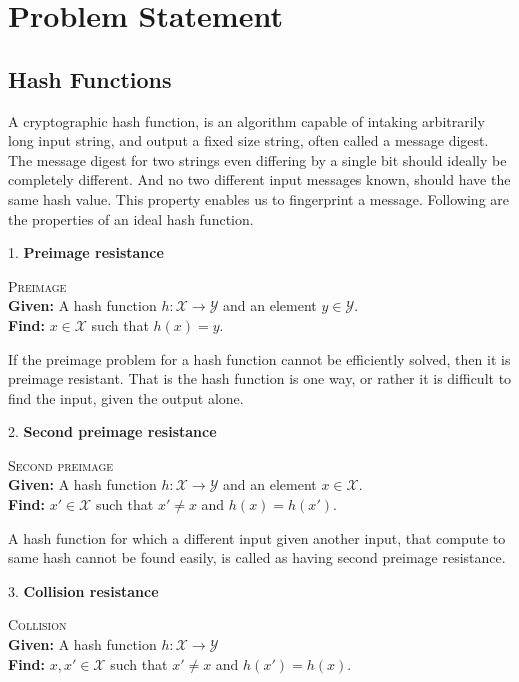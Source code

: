 \documentclass[12pt]{artikel3}                  %
\begin{document}
\clearpage

\section{Problem Statement}

\subsection{Hash Functions}
A cryptographic hash function, is an algorithm capable of intaking arbitrarily long input string, and
output a fixed size string, often called a message digest. The message digest for two strings even 
differing by a single bit should ideally be completely different. And no two different input messages
known, should have the same hash value. This property enables us to fingerprint a message. Following 
are the properties of an ideal hash function\cite{00005}.
  
1. {\bf Preimage resistance}
\begin{center}
  \framebox
  {
    \parbox{350pt}
    {
      \centering \textsc{Preimage} \\
      {\bf Given:} A hash function $h : \mathcal{X} \to \mathcal{Y}$ and an element $y \in \mathcal{Y}$. \\
      {\bf Find:} $x \in \mathcal{X}$ such that $h(x) = y$. 
    }
  }
\end{center}
\vspace{4mm}
If the preimage problem for a hash function cannot be efficiently solved, then it is preimage resistant.
That is the hash function is one way, or rather it is difficult to find the input, given the output alone.

2. {\bf Second preimage resistance}
\begin{center}
  \framebox
  {
    \parbox{350pt}
    {
      \centering \textsc{Second preimage} \\
      {\bf Given:} A hash function $h : \mathcal{X} \to \mathcal{Y}$ and an element $x \in \mathcal{X}$. \\
      {\bf Find:} $x' \in \mathcal{X}$ such that $x' \neq x$ and $h(x) = h(x')$. 
    }
  }
\end{center}
\vspace{4mm}

A hash function for which a different input given another input, that compute to same hash cannot be found 
easily, is called as having second preimage resistance.

3. {\bf Collision resistance}
\begin{center}
  \framebox
  {
    \parbox{350pt}
    {
      \centering \textsc{Collision} \\
      {\bf Given:} A hash function $h : \mathcal{X} \to \mathcal{Y}$  \\
      {\bf Find:} $x, x' \in \mathcal{X}$ such that $x' \neq x$ and $h(x') = h(x)$. 
    }
  }
\end{center}
\vspace{4mm}
\end{document}
